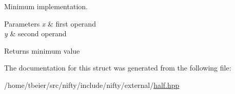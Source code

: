 Minimum implementation. 
\begin{DoxyParams}{Parameters}
{\em x} & first operand \\
\hline
{\em y} & second operand \\
\hline
\end{DoxyParams}
\begin{DoxyReturn}{Returns}
minimum value 
\end{DoxyReturn}


The documentation for this struct was generated from the following file\+:\begin{DoxyCompactItemize}
\item 
/home/tbeier/src/nifty/include/nifty/external/\hyperlink{half_8hpp}{half.\+hpp}\end{DoxyCompactItemize}
